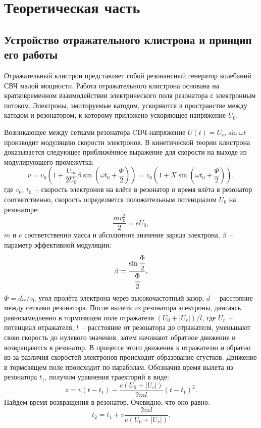 \documentclass[a4paper,14pt]{extarticle}
\begin{document}
	\section{Теоретическая часть}
	\subsection{Устройство отражательного клистрона и принцип его работы}
	Отражательный клистрон представляет собой резонансный генератор колебаний СВЧ малой мощности.
	Работа отражательного клистрона основана на кратковременном взаимодействии электрического поля резонатора с электронным потоком. 
	Электроны,  эмитируемые  катодом,  ускоряются  в  пространстве  между катодом и резонатором, к которому приложено ускоряющее напряжение $U_0$.
	
	Возникающее между сетками резонатора CBЧ-напряжение $U(t)=U_m \sin \omega t$ производит модуляцию скорости электронов. В кинетической
	теории клистрона доказывается следующее приближённое выражение для скорости на выходе из модулирующего промежутка:
	\begin{equation}
	v = v_0 \left(1 + \frac{U_m}{2U_0} \beta \sin \left(\omega t_0 + \frac{\Phi}{2}\right) \right) = v_0 \left(1 + X \sin \left(\omega t_0 + \frac{\Phi}{2}\right) \right) ,
	\end{equation}
	где $v_0$, $t_0$~-- скорость электронов на влёте в резонатор и время влёта в резонатор соответственно, скорость определяется положительным потенциалом $U_0$ на резонаторе:
	\[
	\frac{mv_0^2}{2} = e U_0,
	\]
	$m$ и $e$ соответственно масса и абсолютное значение заряда электрона, $\beta$~-- параметр эффективной модуляции:
	\[
	\beta = \frac{\sin \cfrac{\Phi}{2}}{\cfrac{\Phi}{2}},
	\]
	$\Phi = d\omega/v_0$ угол пролёта электрона через высокочастотный зазор, $d$~-- расстояние между сетками резонатора.
	После вылета из резонатора электроны, двигаясь равнозамедленно в тормозящем поле отражателя $(U_0 + |U_r|)/l$, где $U_r$~-- потенциал отражателя, $l$~-- расстояние от резонатора до отражателя, уменьшают свою скорость до нулевого значения, затем начинают обратное движение и возвращаются в резонатор. В процессе этого движения к отражателю и обратно из-за различия скоростей электронов происходит образование сгустков. Движение в тормозящем поле происходит по параболам. Обозначив время вылета из резонатора $t_1$, получим уравнения траекторий в виде:
	\begin{equation}
	z = v (t - t_1) - \frac{e(U_0 + |U_r|)}{2ml} (t - t_1)^2.
	\end{equation}
	Найдём время возвращения в резонатор. Очевидно, что оно равно:
	\begin{equation}
	t_2 = t_1 +  v \frac{2ml}{e(U_0 + |U_r|)}.
	\end{equation}
	
\end{document}

